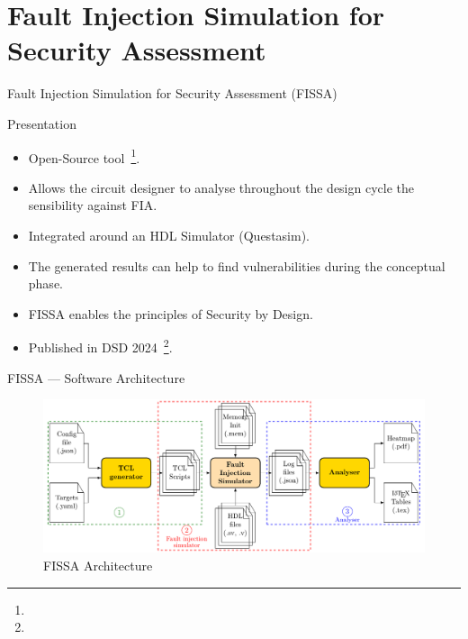 \section{Fault Injection Simulation for Security Assessment}

\begin{frame}{Fault Injection Simulation for Security Assessment (FISSA)}
    \begin{block}{Presentation}
        \begin{itemize}
            \item Open-Source tool~\footnote[frame]{\tiny{}}.
            \item Allows the circuit designer to analyse throughout the design cycle the sensibility against FIA.
            \item Integrated around an HDL Simulator (Questasim).
            \item The generated results can help to find vulnerabilities during the conceptual phase.
            \item FISSA enables the principles of Security by Design.
            \item Published in DSD 2024~\footnote[frame]{\tiny{}}.
        \end{itemize}
    \end{block}
\end{frame}

\begin{frame}{FISSA — Software Architecture}
    \begin{figure}
        \centering
        \includegraphics[width=.9\textwidth, page=2]{src/3_fissa/img/fissa/archi_fissa.pdf}
        \caption{FISSA Architecture}
        \label{fig:archiSoft}
    \end{figure}
\end{frame}


